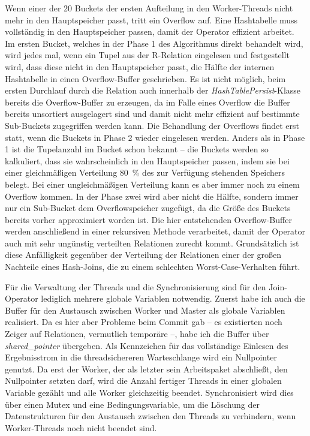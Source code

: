 \documentclass[a4paper,12pt,twoside]{article}
\newcommand{\Fb}[1]{\textit{#1}} %
\begin{document}
Wenn einer der 20 Buckets der ersten Aufteilung in den Worker-Threads nicht mehr in den Hauptspeicher passt, tritt ein Overflow auf. Eine Hashtabelle muss vollständig in den Hauptspeicher passen, damit der Operator effizient arbeitet. Im ersten Bucket, welches in der Phase 1 des Algorithmus direkt behandelt wird, wird jedes mal, wenn ein Tupel aus der R-Relation eingelesen und festgestellt wird, dass diese nicht in den Hauptspeicher passt, die Hälfte der internen Hashtabelle in einen Overflow-Buffer geschrieben. Es ist nicht möglich, beim ersten Durchlauf durch die Relation auch innerhalb der \Fb{HashTablePersist}-Klasse bereits die Overflow-Buffer zu erzeugen, da im Falle eines Overflow die Buffer bereits unsortiert ausgelagert sind und damit nicht mehr effizient auf bestimmte Sub-Buckets zugegriffen werden kann. Die Behandlung der Overflows findet erst statt, wenn die Buckets in Phase 2 wieder eingelesen werden. Anders als in Phase 1 ist die Tupelanzahl im Bucket schon bekannt -- die Buckets werden so kalkuliert, dass sie wahrscheinlich in den Hauptspeicher passen, indem sie bei einer gleichmäßigen Verteilung 80~\% des zur Verfügung stehenden Speichers belegt. Bei einer ungleichmäßigen Verteilung kann es aber immer noch zu einem Overflow kommen. In der Phase zwei wird aber nicht die Hälfte, sondern immer nur ein Sub-Bucket dem Overflowspeicher zugefügt, da die Größe des Buckets bereits vorher approximiert worden ist. Die hier entstehenden Overflow-Buffer werden anschließend in einer rekursiven Methode verarbeitet, damit der Operator auch mit sehr ungünstig verteilten Relationen zurecht kommt. Grundsätzlich ist diese Anfälligkeit gegenüber der Verteilung der Relationen einer der großen Nachteile eines Hash-Joins, die zu einem schlechten Worst-Case-Verhalten führt.

Für die Verwaltung der Threads und die Synchronisierung sind für den Join-Operator lediglich mehrere globale Variablen notwendig. Zuerst habe ich auch die Buffer für den Austausch zwischen Worker und Master als globale Variablen realisiert. Da es hier aber Probleme beim Commit gab -- es existierten noch Zeiger auf Relationen, vermutlich temporäre --, habe ich die Buffer über \Fb{shared\_pointer} übergeben. Als Kennzeichen für das vollständige Einlesen des Ergebnisstrom in die threadsichereren Warteschlange wird ein Nullpointer genutzt. Da erst der Worker, der als letzter sein Arbeitspaket abschließt, den Nullpointer setzten darf, wird die Anzahl fertiger Threads in einer globalen Variable gezählt und alle Worker gleichzeitig beendet. Synchronisiert wird dies über einen Mutex und eine Bedingungsvariable, um die Löschung der Datenstrukturen für den Austausch zwischen den Threads zu verhindern, wenn Worker-Threads noch nicht beendet sind.
 
\end{document}
